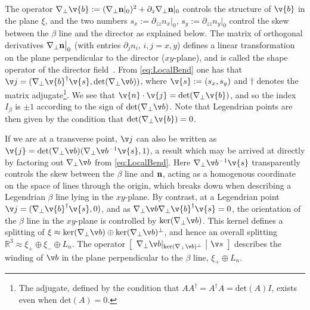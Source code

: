 The operator $\nabla_\perp \v{b} := (\nabla_{\perp}{\bf n}|_{0})^2+\partial_z \nabla_{\perp}{\bf n}|_{0}$ controls the structure of $\v{b}$ in the plane $\xi$, and the two numbers $s_x:=\partial_{zz} n_x|_0$, $s_y:=\partial_{zz} n_y|_0$ control the skew between the $\beta$ line and the director as explained below. The matrix of orthogonal derivatives $\bigl. \nabla_{\perp}{\bf n} \bigr|_{0}$ (with entries $\partial_j n_i$, $i,j=x,y$) defines a linear transformation on the plane perpendicular to the director ($xy$-plane), and is called the shape operator of the director field~\cite{machon16,alexander18}. From \eqref{eq:LocalBend} one has that $\v j = (\nabla_\perp \v{b}^{\dagger} \v{s}, \mathrm{det}(\nabla_\perp \v b))$, where $\v{s}:=(s_x,s_y)$ and $\dagger$ denotes the matrix adjugate\footnote{The adjugate, defined by the condition that $AA^{\dagger} = A^\dagger A = \mathrm{det}(A)I$, exists even when $\mathrm{det}(A)=0$.}. We see that $\v{n}\cdot \v{j} = \mathrm{det}(\nabla_\perp\v{b})$, and so the index $I_\beta$ is $\pm 1$ according to the sign of $\mathrm{det}(\nabla_\perp \v b)$. Note that Legendrian points are then given by the condition that $\mathrm{det}(\nabla_\perp\v{b})=0$. 

If we are at a transverse point, $\v j$ can also be written as $\v{j} = \mathrm{det}(\nabla_\perp \v b)(\nabla_\perp \v b^{-1}\v{s},1)$, a result which may be arrived at directly by factoring out $\nabla_\perp \v b$ from \eqref{eq:LocalBend}. Here $\nabla_\perp \v b^{-1}\v{s}$ transparently controls the skew between the $\beta$ line and $\bf n$, acting as a homogenous coordinate on the space of lines through the origin, which breaks down when describing a Legendrian $\beta$ line lying in the $xy$-plane.  By contrast, at a Legendrian point $\v j = (\nabla_\perp \v{b}^{\dagger} \v{s},0 )$, and as $\nabla_\perp \v b \nabla_\perp \v{b}^{\dagger} \v{s} = 0$, the orientation of the $\beta$ line in the $xy$-plane is controlled by $\mathrm{ker}(\nabla_\perp \v b)$. This kernel defines a splitting of $\xi \approx \mathrm{ker}(\nabla_\perp \v b) \oplus \mathrm{ker}(\nabla_\perp \v b)^\perp $, and hence an overall splitting $\mathbb{R}^3 \approx \xi_+ \oplus \xi_- \oplus L_n$. The operator $\left[\begin{array}{c|c} \nabla_\perp \v b|_{\mathrm{ker}(\nabla_\perp \v b)^\perp} & \v s \end{array}\right]$ describes the winding of $\v b$ in the plane perpendicular to the $\beta$ line, $\xi_+ \oplus L_n$.


